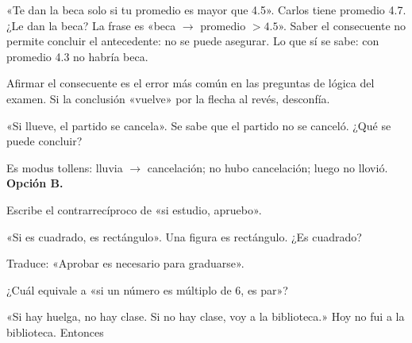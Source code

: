 \begin{ejemplo}[Solo si]
«Te dan la beca solo si tu promedio es mayor que 4.5». Carlos tiene promedio 4.7. ¿Le dan la beca?
\solucion La frase es «beca $\to$ promedio $> 4.5$». Saber el consecuente no permite concluir el antecedente: no se puede
asegurar. Lo que sí se sabe: con promedio 4.3 no habría beca.
\end{ejemplo}

\begin{trampa}
Afirmar el consecuente es el error más común en las preguntas de lógica del examen. Si la conclusión «vuelve» por la
flecha al revés, desconfía.
\end{trampa}

\begin{reto}
«Si llueve, el partido se cancela». Se sabe que el partido no se canceló. ¿Qué se puede concluir?
\end{reto}

\begin{retoresuelto}
Es modus tollens: lluvia $\to$ cancelación; no hubo cancelación; luego no llovió. \textbf{Opción B.}
\end{retoresuelto}

\taller
{}
\begin{ejercicios}
\item Escribe el contrarrecíproco de «si estudio, apruebo». 
\item «Si es cuadrado, es rectángulo». Una figura es rectángulo. ¿Es cuadrado? 
\item Traduce: «Aprobar es necesario para graduarse». 
\end{ejercicios}
\begin{ejercicios}
\item ¿Cuál equivale a «si un número es múltiplo de 6, es par»?
\item «Si hay huelga, no hay clase. Si no hay clase, voy a la biblioteca.» Hoy no fui a la biblioteca. Entonces
\end{ejercicios}

